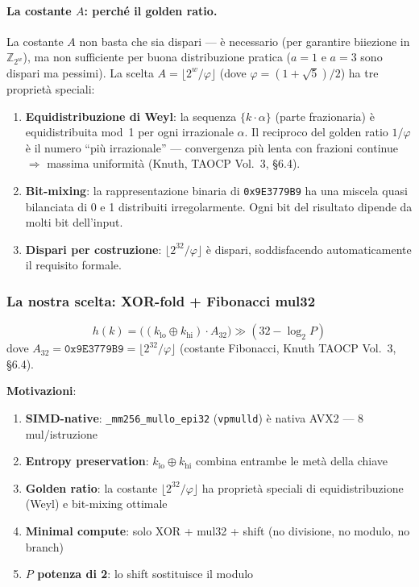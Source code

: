 \documentclass[11pt,a4paper]{article}
\begin{document}
\paragraph{La costante $A$: perché il golden ratio.}
La costante $A$ non basta che sia dispari --- è necessario (per garantire biiezione in $\mathbb{Z}_{2^w}$), ma non sufficiente per buona distribuzione pratica ($a=1$ e $a=3$ sono dispari ma pessimi). La scelta $A = \lfloor 2^w / \varphi \rfloor$ (dove $\varphi = (1+\sqrt{5})/2$) ha tre proprietà speciali:
\begin{enumerate}
    \item \textbf{Equidistribuzione di Weyl}: la sequenza $\{k \cdot \alpha\}$ (parte frazionaria) è equidistribuita mod~1 per ogni irrazionale $\alpha$. Il reciproco del golden ratio $1/\varphi$ è il numero ``più irrazionale'' --- convergenza più lenta con frazioni continue $\Rightarrow$ massima uniformità (Knuth, TAOCP Vol.~3, §6.4).
    \item \textbf{Bit-mixing}: la rappresentazione binaria di \texttt{0x9E3779B9} ha una miscela quasi bilanciata di 0 e 1 distribuiti irregolarmente. Ogni bit del risultato dipende da molti bit dell'input.
    \item \textbf{Dispari per costruzione}: $\lfloor 2^{32}/\varphi \rfloor$ è dispari, soddisfacendo automaticamente il requisito formale.
\end{enumerate}

\subsubsection{La nostra scelta: XOR-fold + Fibonacci mul32}

\begin{equation}
\boxed{h(k) = \bigl((k_\text{lo} \oplus k_\text{hi}) \cdot A_{32}\bigr) \gg (32 - \log_2 P)}
\label{eq:hash}
\end{equation}
dove $A_{32} = \texttt{0x9E3779B9} = \lfloor 2^{32}/\varphi \rfloor$ (costante Fibonacci, Knuth TAOCP Vol.~3, §6.4).

\textbf{Motivazioni}:
\begin{enumerate}
    \item \textbf{SIMD-native}: \texttt{\_mm256\_mullo\_epi32} (\texttt{vpmulld}) è nativa AVX2 --- 8 mul/istruzione
    \item \textbf{Entropy preservation}: $k_\text{lo} \oplus k_\text{hi}$ combina entrambe le metà della chiave
    \item \textbf{Golden ratio}: la costante $\lfloor 2^{32}/\varphi \rfloor$ ha proprietà speciali di equidistribuzione (Weyl) e bit-mixing ottimale
    \item \textbf{Minimal compute}: solo XOR + mul32 + shift (no divisione, no modulo, no branch)
    \item \textbf{$P$ potenza di 2}: lo shift sostituisce il modulo
\end{enumerate}
\end{document}
